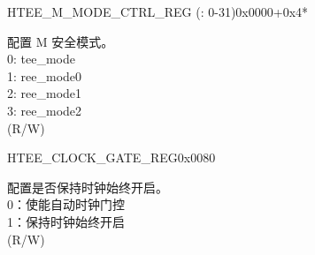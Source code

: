 \begin{register}{H}{TEE\_M\_MODE\_CTRL\_REG (: 0-31)}{0x0000+0x4*}\label{regdesc:TEEM0MODECTRLREG}
%
%
\regnewline%
\begin{regdesc}\begin{reglist}
\label{fielddesc:TEEM0MODE}\item [TEE\_M\regindex{n}\_MODE] 配置 M 安全模式。\\
0: tee\_mode \\
1: ree\_mode0 \\
2: ree\_mode1 \\
3: ree\_mode2  \\ (R/W)
\end{reglist}\end{regdesc}
\end{register}


































































\begin{register}{H}{TEE\_CLOCK\_GATE\_REG}{0x0080}\label{regdesc:TEECLOCKGATEREG}
%
%
\regnewline%
\begin{regdesc}\begin{reglist}
\label{fielddesc:TEECLKEN}\item [TEE\_CLK\_EN] 配置是否保持时钟始终开启。\\
0：使能自动时钟门控 \\
1：保持时钟始终开启 \\ (R/W)
\end{reglist}\end{regdesc}
\end{register}


